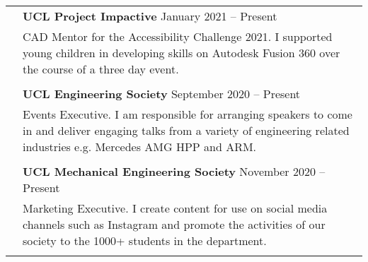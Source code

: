 \documentclass[letterpaper, 11pt]{article}
\begin{document}
\begin{longtable}{p{1.3in}p{4.8in}}




\color{OliveGreen}{Service and outreach}
& \textbf{UCL Project Impactive} \hfill January 2021 -- Present \\
& CAD Mentor for the Accessibility Challenge 2021. I supported young children in developing skills on Autodesk Fusion 360 over the course of a three day event. \\
& \\

& \textbf{UCL Engineering Society} \hfill September 2020 -- Present \\
& Events Executive. I am responsible for arranging speakers to come in and deliver engaging talks from a variety of engineering related industries e.g. Mercedes AMG HPP and ARM. \\
& \\

& \textbf{UCL Mechanical Engineering Society} \hfill November 2020 -- Present \\
& Marketing Executive. I create content for use on social media channels such as Instagram and promote the activities of our society to the 1000+ students in the department. \\
& \\




\end{longtable}
\end{document}
